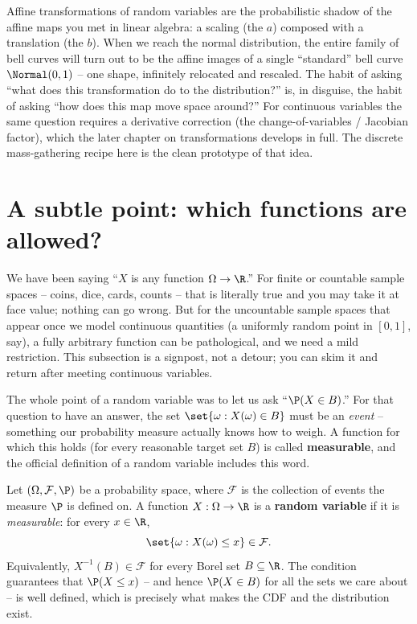 \begin{connectionbox}
Affine transformations of random variables are the probabilistic shadow of the affine
maps you met in linear algebra: a scaling (the $a$) composed with a translation (the
$b$). When we reach the normal distribution, the entire family of bell curves will turn
out to be the affine images of a single ``standard'' bell curve $\Normal(0,1)$ -- one
shape, infinitely relocated and rescaled. The habit of asking ``what does this
transformation do to the distribution?'' is, in disguise, the habit of asking ``how
does this map move space around?'' For continuous variables the same question requires
a derivative correction (the change-of-variables / Jacobian factor), which the later
chapter on transformations develops in full. The discrete mass-gathering recipe here
is the clean prototype of that idea.
\end{connectionbox}

\section{A subtle point: which functions are allowed?}
\label{ch06:measurability}

We have been saying ``$X$ is any function $\Omega \to \R$.'' For finite or countable
sample spaces -- coins, dice, cards, counts -- that is literally true and you may take
it at face value; nothing can go wrong. But for the uncountable sample spaces that
appear once we model continuous quantities (a uniformly random point in $[0,1]$, say),
a fully arbitrary function can be pathological, and we need a mild restriction. This
subsection is a signpost, not a detour; you can skim it and return after meeting
continuous variables.

The whole point of a random variable was to let us ask ``$\P(X \in B)$.'' For that
question to have an answer, the set $\set{\omega : X(\omega) \in B}$ must be an
\emph{event} -- something our probability measure actually knows how to weigh. A
function for which this holds (for every reasonable target set $B$) is called
\textbf{measurable}, and the official definition of a random variable includes this
word.

\begin{formalbox}
Let $(\Omega, \mathcal{F}, \P)$ be a probability space, where $\mathcal{F}$ is the
collection of events the measure $\P$ is defined on. A function $X : \Omega \to \R$ is a
\textbf{random variable} if it is \emph{measurable}: for every $x \in \R$,
\[
  \set{\omega : X(\omega) \le x} \in \mathcal{F}.
\]
Equivalently, $X^{-1}(B) \in \mathcal{F}$ for every Borel set $B \subseteq \R$. The
condition guarantees that $\P(X \le x)$ -- and hence $\P(X \in B)$ for all the sets we
care about -- is well defined, which is precisely what makes the CDF and the
distribution exist.
\end{formalbox}

